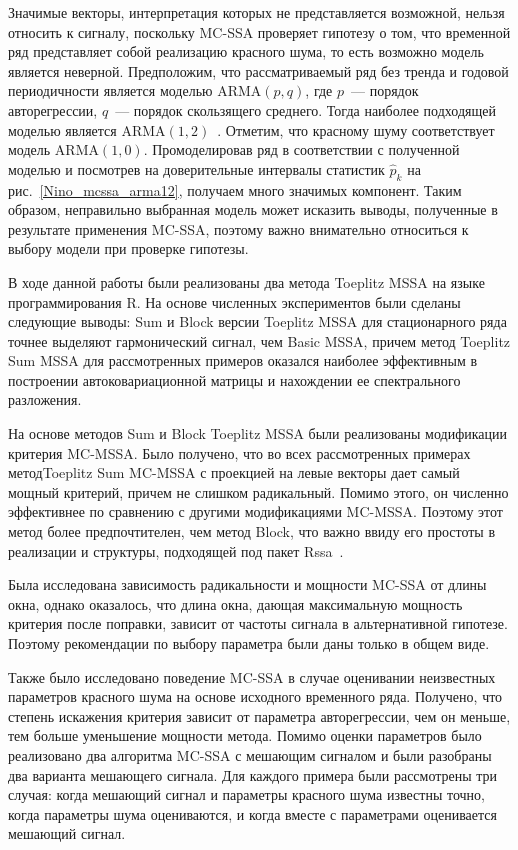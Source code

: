 \documentclass[specialist,
substylefile = spbu_report.rtx,
subf,href,colorlinks=true, 12pt]{disser}
\theoremstyle{definition}
\begin{document}
Значимые векторы, интерпретация которых не представляется возможной, нельзя относить к сигналу, поскольку MC-SSA проверяет гипотезу о том, что временной ряд представляет собой реализацию красного шума, то есть возможно модель является неверной. Предположим, что рассматриваемый ряд без тренда и годовой периодичности является моделью ARMA$(p, q)$, где $p$~--- порядок авторегрессии, $q$~--- порядок скользящего среднего. Тогда наиболее подходящей моделью является ARMA$(1, 2)$~\cite{Hyndman2008}. Отметим, что красному шуму соответствует модель ARMA$(1, 0)$. Промоделировав ряд в соответствии с полученной моделью и посмотрев на доверительные интервалы статистик $\hat p_k$ на рис.~\ref{Nino_mcssa_arma12}, получаем много значимых компонент. Таким образом, неправильно выбранная модель может исказить выводы, полученные в результате применения MC-SSA, поэтому важно внимательно относиться к выбору модели при проверке гипотезы.



\conclusion
В ходе данной работы были реализованы два метода Toeplitz MSSA на языке программирования \textsf{R}. На основе численных экспериментов были сделаны следующие выводы: Sum и Block версии Toeplitz MSSA для стационарного ряда точнее выделяют гармонический сигнал, чем Basic MSSA, причем метод Toeplitz Sum MSSA для рассмотренных примеров оказался наиболее эффективным в построении автоковариационной матрицы и нахождении ее спектрального разложения.

На основе методов Sum и Block Toeplitz MSSA были реализованы модификации критерия MC-MSSA. Было получено, что во всех рассмотренных примерах метод\linebreak Toeplitz Sum MC-MSSA с проекцией на левые векторы дает самый мощный критерий, причем не слишком радикальный. Помимо этого, он численно эффективнее по сравнению с другими модификациями MC-MSSA. Поэтому этот метод более предпочтителен, чем метод Block, что важно ввиду его простоты в реализации и структуры, подходящей под пакет \textsf{Rssa}~\cite{Rssa}.

Была исследована зависимость радикальности и мощности MC-SSA от длины окна, однако оказалось, что длина окна, дающая максимальную мощность критерия после поправки, зависит от частоты сигнала в альтернативной гипотезе. Поэтому рекомендации по выбору параметра были даны только в общем виде.

Также было исследовано поведение MC-SSA в случае оценивании неизвестных параметров красного шума на основе исходного временного ряда. Получено, что степень искажения критерия зависит от параметра авторегрессии, чем он меньше, тем больше уменьшение мощности метода. Помимо оценки параметров было реализовано два алгоритма MC-SSA с мешающим сигналом и были разобраны два варианта мешающего сигнала. Для каждого примера были рассмотрены три случая: когда мешающий сигнал и параметры красного шума известны точно, когда параметры шума оцениваются, и когда вместе с параметрами оценивается мешающий сигнал.
\end{document}
